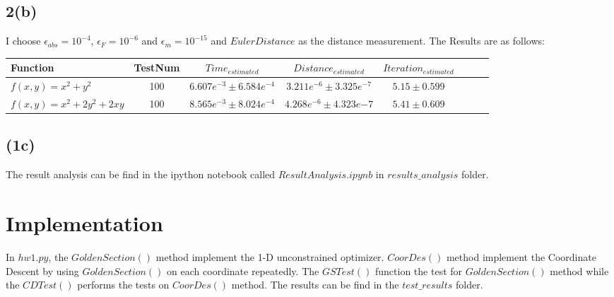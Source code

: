 \documentclass[11pt]{article}
\begin{document}
\subsection{2(b)}
I choose $\epsilon_{abs}=10^{-4}$, $\epsilon_{F}=10^{-6}$ and $\epsilon_{m}=10^{-15}$ and $Euler Distance$ as the distance measurement. The Results are as follows:
\begin{center} 
\begin{tabular}{l*{6}{c}r} Function & TestNum & $Time_{estimated}$ & $Distance_{estimated}$ & $Iteration_{estimated}$
 \\ \hline $f(x,y)=x^2+y^2$ & 100 & $6.607e^{-3}\pm 6.584e^{-4}$ & $3.211e^{-6}\pm 3.325e^{-7}$ & $5.15\pm 0.599$
\\ $f(x,y)=x^2+2y^2+2xy$ & 100 & $8.565e^{-3}\pm 8.024e^{-4}$ & $4.268e^{-6}\pm 4.323e{-7}$ & $5.41\pm 0.609$
\\ \end{tabular}
 \end{center}
\subsection{(1c)}
The result analysis can be find in the ipython notebook called $ResultAnalysis.ipynb$ in $results\_analysis$ folder.
\section{Implementation}
In $hw1.py$,  the $GoldenSection()$ method implement the 1-D unconstrained optimizer. $CoorDes()$ method implement the Coordinate Descent by using $GoldenSection()$ on each coordinate repeatedly. The $GSTest()$ function the test for $GoldenSection()$ method while the $CDTest()$ performs the tests on $CoorDes()$ method. The results can be find in the $test\_results$ folder.
\end{document}
